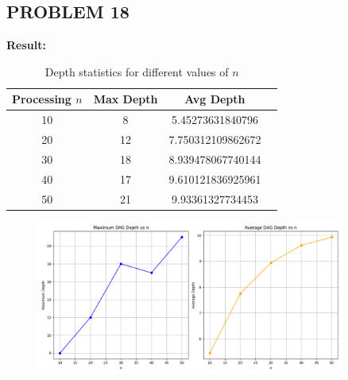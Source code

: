 \documentclass{article}
\begin{document}
\newpage

\subsection*{PROBLEM 18}

\textbf{Result: }
\\
\begin{table}[h!]
    \centering
    \begin{tabular}{@{}cccc@{}}
    \toprule
    \textbf{Processing \( n \)} & \textbf{Max Depth} & \textbf{Avg Depth} \\ \midrule
    10 & 8  & 5.45273631840796 \\
    20 & 12 & 7.750312109862672 \\
    30 & 18 & 8.939478067740144 \\
    40 & 17 & 9.610121836925961 \\
    50 & 21 & 9.93361327734453 \\ \bottomrule
    \end{tabular}
    \caption{Depth statistics for different values of \( n \)}
\end{table}

\begin{figure}[h]
    \centering
    \includegraphics[width=0.9\textwidth]{Figure_1.png}
    \label{fig:model}
\end{figure}
\end{document}

